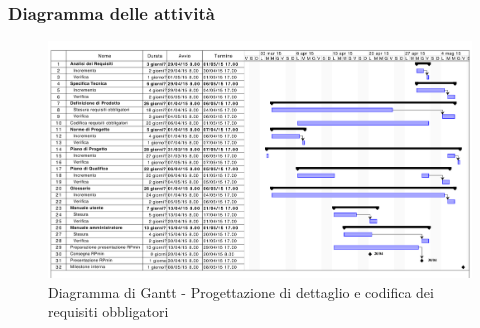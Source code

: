 		\subsubsection{Diagramma delle attività} %
		\label{ssub:diagramma_delle_attivita}
			\begin{figure}[htbp]
				\centering
				\centerline{\includegraphics[scale=0.7]{images/d_attivita_prog_dett_cod_obbl.pdf}}
				\caption{Diagramma di Gantt - Progettazione di dettaglio e codifica dei requisiti obbligatori}
				\label{fig:gantt_prog_dett_cod_requisiti_obbligatori}
			\end{figure}
	
